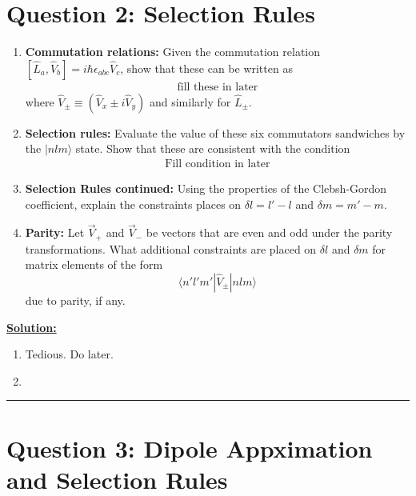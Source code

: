 \documentclass{article}
\newcommand{\ket}[1]{|#1 \rangle}
\newcommand{\inner}[2]{\langle #1 | #2 \rangle}
\begin{document}
\section*{Question 2: Selection Rules} 
\begin{enumerate}[label=(\alph*)]
  \item \textbf{Commutation relations:} Given the commutation relation $[\hat{L}_a, \hat{V}_b] = i\hbar \epsilon_{abc} \hat{V}_c$, show that these can be written as 
  \begin{align*}
    \text{fill these in later}
  \end{align*} where $\hat{V}_{\pm} \equiv \left(\hat{V}_{x} \pm i \hat{V}_y\right)$ and similarly for $\hat{L}_{\pm}$.

  \item \textbf{Selection rules:} Evaluate the value of these six commutators sandwiches by the $\ket{nlm}$ state. Show that these are consistent with the condition
  \begin{align*}
    \text{Fill condition in later}
  \end{align*}

  \item \textbf{Selection Rules continued:} Using the properties of the Clebsh-Gordon coefficient, explain the constraints places on $\delta l = l' - l$ and $\delta m = m' - m$.
  
  \item \textbf{Parity:} Let $\vec{V}_+$ and $\vec{V}_{-}$ be vectors that are even and odd under the parity transformations. What additional constraints are placed on $\delta l$ and $\delta m$ for matrix elements of the form 
  \[  \inner{n'l'm'}{\hat{V}_{\pm}|nlm}  \] due to parity, if any.
\end{enumerate}

\vskip 0.5cm
\underline{\textbf{Solution:}} 

\begin{enumerate}[label=(\alph*)]
  \item Tedious. Do later.
  \item 
\end{enumerate}


\vskip 0.5cm 
\hrule 
\vskip 0.5cm


\section*{Question 3: Dipole Appximation and Selection Rules} 
\end{document}
